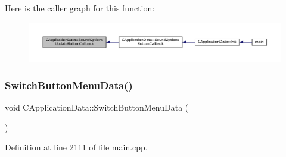 Here is the caller graph for this function\+:
\nopagebreak
\begin{figure}[H]
\begin{center}
\leavevmode
\includegraphics[width=350pt]{classCApplicationData_ae63c8ca19ddeb92a3aaf0a5d67d09e58_icgraph}
\end{center}
\end{figure}
\hypertarget{classCApplicationData_a2a464fd480c791ab13a1b1ca855e4578}{}\label{classCApplicationData_a2a464fd480c791ab13a1b1ca855e4578} 
\subsubsection{\texorpdfstring{Switch\+Button\+Menu\+Data()}{SwitchButtonMenuData()}}
{\footnotesize\ttfamily void C\+Application\+Data\+::\+Switch\+Button\+Menu\+Data (\begin{DoxyParamCaption}{ }\end{DoxyParamCaption})\hspace{0.3cm}{\ttfamily [protected]}}



Definition at line 2111 of file main.\+cpp.



